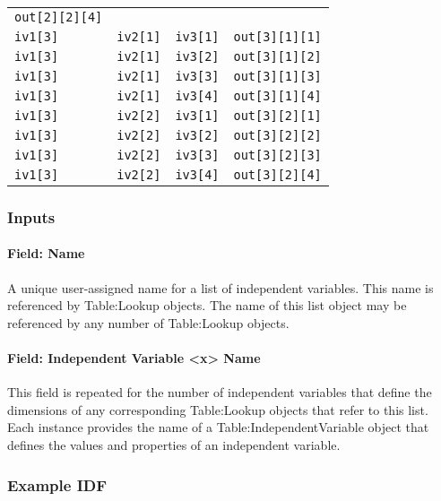 \begin{longtable}[]{@{}llll@{}}
\texttt{out{[}2{]}{[}2{]}{[}4{]}}\tabularnewline
\texttt{iv1{[}3{]}} & \texttt{iv2{[}1{]}} & \texttt{iv3{[}1{]}} &
\texttt{out{[}3{]}{[}1{]}{[}1{]}}\tabularnewline
\texttt{iv1{[}3{]}} & \texttt{iv2{[}1{]}} & \texttt{iv3{[}2{]}} &
\texttt{out{[}3{]}{[}1{]}{[}2{]}}\tabularnewline
\texttt{iv1{[}3{]}} & \texttt{iv2{[}1{]}} & \texttt{iv3{[}3{]}} &
\texttt{out{[}3{]}{[}1{]}{[}3{]}}\tabularnewline
\texttt{iv1{[}3{]}} & \texttt{iv2{[}1{]}} & \texttt{iv3{[}4{]}} &
\texttt{out{[}3{]}{[}1{]}{[}4{]}}\tabularnewline
\texttt{iv1{[}3{]}} & \texttt{iv2{[}2{]}} & \texttt{iv3{[}1{]}} &
\texttt{out{[}3{]}{[}2{]}{[}1{]}}\tabularnewline
\texttt{iv1{[}3{]}} & \texttt{iv2{[}2{]}} & \texttt{iv3{[}2{]}} &
\texttt{out{[}3{]}{[}2{]}{[}2{]}}\tabularnewline
\texttt{iv1{[}3{]}} & \texttt{iv2{[}2{]}} & \texttt{iv3{[}3{]}} &
\texttt{out{[}3{]}{[}2{]}{[}3{]}}\tabularnewline
\texttt{iv1{[}3{]}} & \texttt{iv2{[}2{]}} & \texttt{iv3{[}4{]}} &
\texttt{out{[}3{]}{[}2{]}{[}4{]}}\tabularnewline
\bottomrule
\end{longtable}

\subsubsection{Inputs}\label{inputs-1}

\paragraph{Field: Name}\label{field-name-1}

A unique user-assigned name for a list of independent variables. This
name is referenced by Table:Lookup objects. The name of this list object
may be referenced by any number of Table:Lookup objects.

\paragraph{Field: Independent Variable \textless{}x\textgreater{}
Name}\label{field-independent-variable-x-name}

This field is repeated for the number of independent variables that
define the dimensions of any corresponding Table:Lookup objects that
refer to this list. Each instance provides the name of a
Table:IndependentVariable object that defines the values and properties
of an independent variable.

\subsubsection{Example IDF}\label{example-idf-1}

